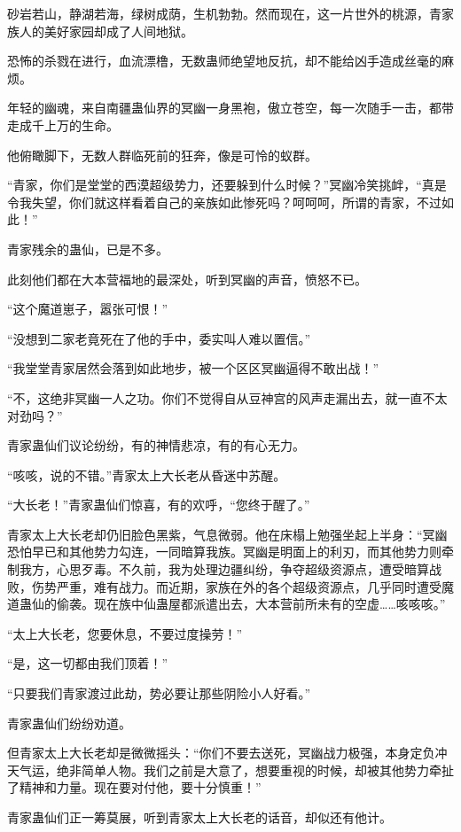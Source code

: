 \begin{this_body}
砂岩若山，静湖若海，绿树成荫，生机勃勃。然而现在，这一片世外的桃源，青家族人的美好家园却成了人间地狱。

恐怖的杀戮在进行，血流漂橹，无数蛊师绝望地反抗，却不能给凶手造成丝毫的麻烦。

年轻的幽魂，来自南疆蛊仙界的冥幽一身黑袍，傲立苍空，每一次随手一击，都带走成千上万的生命。

他俯瞰脚下，无数人群临死前的狂奔，像是可怜的蚁群。

“青家，你们是堂堂的西漠超级势力，还要躲到什么时候？”冥幽冷笑挑衅，“真是令我失望，你们就这样看着自己的亲族如此惨死吗？呵呵呵，所谓的青家，不过如此！”

青家残余的蛊仙，已是不多。

此刻他们都在大本营福地的最深处，听到冥幽的声音，愤怒不已。

“这个魔道崽子，嚣张可恨！”

“没想到二家老竟死在了他的手中，委实叫人难以置信。”

“我堂堂青家居然会落到如此地步，被一个区区冥幽逼得不敢出战！”

“不，这绝非冥幽一人之功。你们不觉得自从豆神宫的风声走漏出去，就一直不太对劲吗？”

青家蛊仙们议论纷纷，有的神情悲凉，有的有心无力。

“咳咳，说的不错。”青家太上大长老从昏迷中苏醒。

“大长老！”青家蛊仙们惊喜，有的欢呼，“您终于醒了。”

青家太上大长老却仍旧脸色黑紫，气息微弱。他在床榻上勉强坐起上半身：“冥幽恐怕早已和其他势力勾连，一同暗算我族。冥幽是明面上的利刃，而其他势力则牵制我方，心思歹毒。不久前，我为处理边疆纠纷，争夺超级资源点，遭受暗算战败，伤势严重，难有战力。而近期，家族在外的各个超级资源点，几乎同时遭受魔道蛊仙的偷袭。现在族中仙蛊屋都派遣出去，大本营前所未有的空虚……咳咳咳。”

“太上大长老，您要休息，不要过度操劳！”

“是，这一切都由我们顶着！”

“只要我们青家渡过此劫，势必要让那些阴险小人好看。”

青家蛊仙们纷纷劝道。

但青家太上大长老却是微微摇头：“你们不要去送死，冥幽战力极强，本身定负冲天气运，绝非简单人物。我们之前是大意了，想要重视的时候，却被其他势力牵扯了精神和力量。现在要对付他，要十分慎重！”

青家蛊仙们正一筹莫展，听到青家太上大长老的话音，却似还有他计。

\end{this_body}

